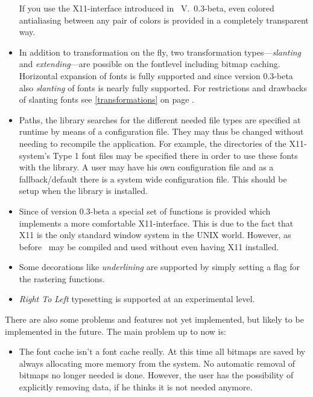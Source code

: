 \begin{itemize}
  If you use the X11-interface introduced in \tonelib\ V.\ 0.3-beta, 
  even colored antialiasing between any pair of colors is provided in a
  completely transparent way.
\item In addition to transformation on the fly, two transformation
  types---{\em slanting} and {\em extending}---are possible on the fontlevel
  including bitmap caching. Horizontal expansion of fonts is fully supported
  and since version 0.3-beta also {\em slanting} of fonts is nearly fully
  supported.  For restrictions and drawbacks of slanting fonts see
  \ref{transformations} on page \pageref{transformations}.
\item Paths, the library searches for the different needed file types
  are specified at runtime by means of a
  configuration file. They may thus be changed without needing to
  recompile the application. For example, the directories of the
  X11-system's Type 1 font files may be specified there in order to use
  these fonts with the library. A user may have his own configuration file and
  as a fallback/default there is a system wide configuration file. This should
  be setup when the library is installed.
\item Since of version 0.3-beta a special set of functions is provided which
  implements a more comfortable X11-interface. This is due to the fact that
  X11 is the only standard window system in the UNIX world. However, as before
  \tonelib\ may be compiled and used without even having X11 installed.
\item Some decorations like {\em underlining} are supported by simply setting
  a flag for the rastering functions.
\item {\em Right To Left} typesetting is supported at an experimental level.
\end{itemize}
There are also some problems and features not yet
implemented, but likely to be implemented in the future.
The main problem up to now is:
\begin{itemize}
\item The font cache isn't a font cache really. At this time all
  bitmaps are saved by always allocating more memory from the
  system. No automatic removal of bitmaps no longer needed is 
  done. However, the user has the possibility of explicitly
  removing data, if he thinks it is not needed anymore.
\end{itemize}

